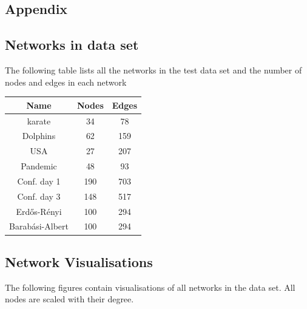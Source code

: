 \documentclass[11pt]{article}
\theoremstyle{definition}
\begin{document}
\begin{appendices}
\section{Appendix}

\subsection{Networks in data set}

The following table lists all the networks in the test data set and the number of nodes and edges in each network

\begin{center}
\begin{tabular}{ | c | c | c | }
  \hline
  Name & Nodes & Edges \\ \hline
  karate & 34 & 78 \\ \hline
  Dolphins & 62 & 159 \\ \hline
  USA & 27 & 207 \\ \hline
  Pandemic & 48 & 93 \\ \hline
  Conf. day 1 & 190 & 703 \\ \hline
  Conf. day 3 & 148 & 517 \\ \hline
  Erd\H{o}s-R\'enyi & 100 & 294 \\ \hline
  Barab\'asi-Albert & 100 & 294 \\ \hline
\end{tabular}
\end{center}

\cleardoublepage

\subsection{Network Visualisations}

The following figures contain visualisations of all networks in the data set. All nodes are scaled with their degree.


\end{appendices}
\end{document}
